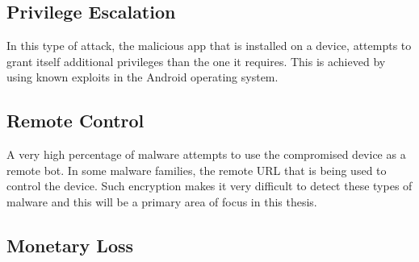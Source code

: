 	\subsection{Privilege Escalation}
		In this type of attack, the malicious app that is installed on a device, attempts to grant itself additional privileges than the one it requires. This is achieved by using known exploits in the Android operating system.
	\subsection{Remote Control}
		A very high percentage of malware attempts to use the compromised device as a remote bot. In some malware families, the remote URL that is being used to control the device. Such encryption makes it very difficult to detect these types of malware and this will be a primary area of focus in this thesis.
	\subsection{Monetary Loss}
		
	